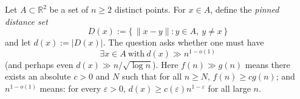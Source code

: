 Let $A\subset\mathbb R^2$ be a set of $n\ge 2$ distinct points.
For $x\in A$, define the \emph{pinned distance set}
\[
D(x):=\{\,\|x-y\|: y\in A,\ y\neq x\,\}
\]
and let $d(x):=|D(x)|$.
The question asks whether one must have
\[
\exists x\in A\ \text{with}\ d(x)\gg n^{1-o(1)}
\]
(and perhaps even $d(x)\gg n/\sqrt{\log n}$).
Here $f(n)\gg g(n)$ means there exists an absolute $c>0$ and $N$ such that for all $n\ge N$, $f(n)\ge c g(n)$; and $n^{1-o(1)}$ means: for every $\varepsilon>0$, $d(x)\ge c(\varepsilon)n^{1-\varepsilon}$ for all large $n$.
